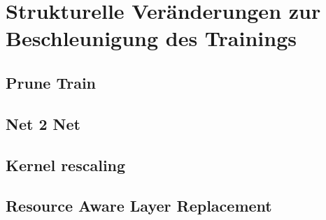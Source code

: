 \chapter{Strukturelle Veränderungen zur Beschleunigung des Trainings}

\section{Prune Train}


\section{Net 2 Net}


\section{Kernel rescaling}


\section{Resource Aware Layer Replacement}
